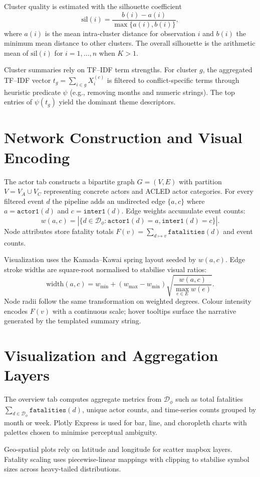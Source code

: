 \documentclass[11pt]{article}
\begin{document}
Cluster quality is estimated with the silhouette coefficient
\[ \mathrm{sil}(i) = \frac{b(i) - a(i)}{\max\{a(i), b(i)\}}, \]
where $a(i)$ is the mean intra-cluster distance for observation $i$ and $b(i)$ the minimum mean distance to other clusters. The overall silhouette is the arithmetic mean of $\mathrm{sil}(i)$ for $i=1,\dots,n$ when $K>1$.

Cluster summaries rely on TF--IDF term strengths. For cluster $g$, the aggregated TF--IDF vector $t_g = \sum_{i \in g} X^{(c)}_i$ is filtered to conflict-specific terms through heuristic predicate $\psi$ (e.g., removing months and numeric strings). The top entries of $\psi(t_g)$ yield the dominant theme descriptors.

\section{Network Construction and Visual Encoding}
The actor tab constructs a bipartite graph $G = (V, E)$ with partition $V = V_A \cup V_C$ representing concrete actors and ACLED actor categories. For every filtered event $d$ the pipeline adds an undirected edge $\{a, c\}$ where $a = \texttt{actor1}(d)$ and $c = \texttt{inter1}(d)$. Edge weights accumulate event counts:
\[ w(a,c) = |\{ d \in \mathcal{D}_\phi : \texttt{actor1}(d) = a, \texttt{inter1}(d) = c \}|. \]
Node attributes store fatality totals $F(v) = \sum_{d \mapsto v} \texttt{fatalities}(d)$ and event counts.

Visualization uses the Kamada--Kawai spring layout seeded by $w(a,c)$. Edge stroke widths are square-root normalised to stabilise visual ratios:
\[ \mathrm{width}(a,c) = w_{\min} + (w_{\max} - w_{\min}) \sqrt{\frac{w(a,c)}{\max_{e \in E} w(e)}} . \]
Node radii follow the same transformation on weighted degrees. Colour intensity encodes $F(v)$ with a continuous scale; hover tooltips surface the narrative generated by the templated summary string.

\section{Visualization and Aggregation Layers}
The overview tab computes aggregate metrics from $\mathcal{D}_\phi$ such as total fatalities $\sum_{d \in \mathcal{D}_\phi} \texttt{fatalities}(d)$, unique actor counts, and time-series counts grouped by month or week. Plotly Express is used for bar, line, and choropleth charts with palettes chosen to minimise perceptual ambiguity.

Geo-spatial plots rely on latitude and longitude for scatter mapbox layers. Fatality scaling uses piecewise-linear mappings with clipping to stabilise symbol sizes across heavy-tailed distributions.
\end{document}
